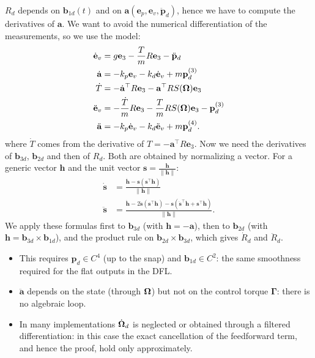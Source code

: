 \documentclass[10pt, a4paper]{report}
\begin{document}
\noindent $R_d$ depends on $\mathbf b_{1d}(t)$ and on $\mathbf a(\mathbf e_p,\mathbf e_v,\ddot{\mathbf p}_d)$, hence we have to compute the derivatives of $\mathbf a$. We want to avoid the numerical differentiation of the measurements, so we use the model:\begin{align}
    \dot{\mathbf e}_v&=g\mathbf e_3-\frac{T}{m}R\mathbf e_3-\ddot{\mathbf p}_d\\
    \dot{\mathbf a}&=-k_p\mathbf e_v-k_d\dot{\mathbf e}_v+m\mathbf p_d^{(3)}\\
    \dot T&=-\dot{\mathbf a}^\top R\mathbf e_3-\mathbf a^\top RS({\boldsymbol{\Omega}})\mathbf e_3\\
    \ddot{\mathbf e}_v&=-\frac{\dot T}{m}R\mathbf e_3-\frac{T}{m}RS({\boldsymbol{\Omega}})\mathbf e_3-\mathbf p_d^{(3)}\\
    \ddot{\mathbf a}&=-k_p\dot{\mathbf e}_v-k_d\ddot{\mathbf e}_v+m\mathbf p_d^{(4)}.
\end{align}
where $\dot T$ comes from the derivative of $T=-\mathbf a^\top R\mathbf e_3$. Now we need the derivatives of $\mathbf b_{3d}$, $\mathbf b_{2d}$ and then of $R_d$. Both are obtained by normalizing a vector. For a generic vector $\mathbf h$ and the unit vector $\mathbf s=\frac{\mathbf h}{\|\mathbf h\|}$:\begin{align}
    \dot{\mathbf s}&=\frac{\dot{\mathbf h}-\mathbf s(\mathbf s^\top\dot{\mathbf h})}{\|\mathbf h\|}\\
    \ddot{\mathbf s}&=\frac{\ddot{\mathbf h}-2\dot{\mathbf s}(\mathbf s^\top\dot{\mathbf h})-\mathbf s(\dot{\mathbf s}^\top\dot{\mathbf h}+\mathbf s^\top\ddot{\mathbf h})}{\|\mathbf h\|}.
\end{align}
We apply these formulas first to $\mathbf b_{3d}$ (with $\mathbf h=-\mathbf a$), then to $\mathbf b_{2d}$ (with $\mathbf h=\mathbf b_{3d}\times\mathbf b_{1d}$), and the product rule on $\mathbf b_{2d}\times\mathbf b_{3d}$, which gives $\dot R_d$ and $\ddot R_d$.
\begin{itemize}
    \item This requires $\mathbf p_d\in C^4$ (up to the snap) and $\mathbf b_{1d}\in C^2$: the same smoothness required for the flat outputs in the DFL.
    \item $\ddot{\mathbf a}$ depends on the state (through ${\boldsymbol{\Omega}}$) but not on the control torque $\boldsymbol\Gamma$: there is no algebraic loop.
    \item In many implementations $\dot{{\boldsymbol{\Omega}}}_d$ is neglected or obtained through a filtered differentiation: in this case the exact cancellation of the feedforward term, and hence the proof, hold only approximately.
\end{itemize}
\end{document}
